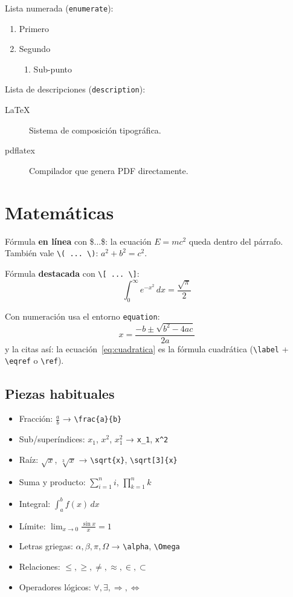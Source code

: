 Lista numerada (\texttt{enumerate}):
\begin{enumerate}
  \item Primero
  \item Segundo
  \begin{enumerate}
    \item Sub-punto
  \end{enumerate}
\end{enumerate}

Lista de descripciones (\texttt{description}):
\begin{description}
  \item[LaTeX] Sistema de composición tipográfica.
  \item[pdflatex] Compilador que genera PDF directamente.
\end{description}

\section{Matemáticas}
Fórmula \textbf{en línea} con \$...\$: la ecuación $E = mc^2$ queda
dentro del párrafo. También vale \texttt{\textbackslash( ... \textbackslash)}: \(a^2+b^2=c^2\).

Fórmula \textbf{destacada} con \texttt{\textbackslash[ ... \textbackslash]}:
\[
  \int_0^{\infty} e^{-x^2}\,dx = \frac{\sqrt{\pi}}{2}
\]

Con numeración usa el entorno \texttt{equation}:
\begin{equation}
  x = \frac{-b \pm \sqrt{b^2 - 4ac}}{2a}
  \label{eq:cuadratica}
\end{equation}
y la citas así: la ecuación~\eqref{eq:cuadratica} es la fórmula cuadrática
(\texttt{\textbackslash label} + \texttt{\textbackslash eqref} o \texttt{\textbackslash ref}).

\subsection{Piezas habituales}
\begin{itemize}
  \item Fracción: $\frac{a}{b}$ → \texttt{\textbackslash frac\{a\}\{b\}}
  \item Sub/superíndices: $x_1$, $x^2$, $x_1^2$ → \texttt{x\_1}, \texttt{x\^{}2}
  \item Raíz: $\sqrt{x}$, $\sqrt[3]{x}$ → \texttt{\textbackslash sqrt\{x\}}, \texttt{\textbackslash sqrt[3]\{x\}}
  \item Suma y producto: $\sum_{i=1}^{n} i$, $\prod_{k=1}^{n} k$
  \item Integral: $\int_a^b f(x)\,dx$
  \item Límite: $\lim_{x \to 0} \frac{\sin x}{x} = 1$
  \item Letras griegas: $\alpha, \beta, \pi, \Omega$ → \texttt{\textbackslash alpha}, \texttt{\textbackslash Omega}
  \item Relaciones: $\leq, \geq, \neq, \approx, \in, \subset$
  \item Operadores lógicos: $\forall, \exists, \Rightarrow, \Leftrightarrow$
\end{itemize}

